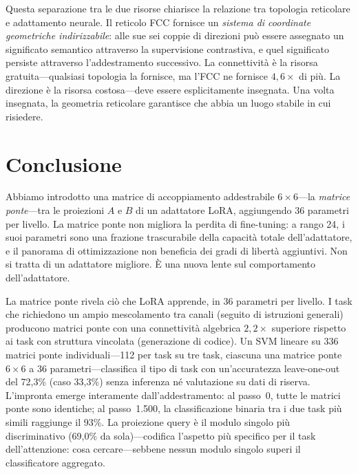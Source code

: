 \documentclass[11pt]{article}
\begin{document}
Questa separazione tra le due risorse chiarisce la relazione tra
topologia reticolare e adattamento neurale. Il reticolo FCC fornisce un
\emph{sistema di coordinate geometriche indirizzabile}: alle sue sei
coppie di direzioni pu\`o essere assegnato un significato semantico
attraverso la supervisione contrastiva, e quel significato persiste
attraverso l'addestramento successivo. La connettivit\`a \`e la risorsa
gratuita---qualsiasi topologia la fornisce, ma l'FCC ne fornisce
$4{,}6\times$ di pi\`u. La direzione \`e la risorsa costosa---deve
essere esplicitamente insegnata. Una volta insegnata, la geometria
reticolare garantisce che abbia un luogo stabile in cui risiedere.

\section{Conclusione}
\label{sec:conclusion}

Abbiamo introdotto una matrice di accoppiamento addestrabile
$6 \times 6$---la \emph{matrice ponte}---tra le proiezioni $A$ e $B$ di
un adattatore LoRA, aggiungendo 36 parametri per livello. La matrice
ponte non migliora la perdita di fine-tuning: a rango 24, i suoi
parametri sono una frazione trascurabile della capacit\`a totale
dell'adattatore, e il panorama di ottimizzazione non beneficia dei gradi
di libert\`a aggiuntivi. Non si tratta di un adattatore migliore. \`E
una nuova lente sul comportamento dell'adattatore.

La matrice ponte rivela ci\`o che LoRA apprende, in 36 parametri per
livello. I task che richiedono un ampio mescolamento tra canali (seguito
di istruzioni generali) producono matrici ponte con una connettivit\`a
algebrica $2{,}2\times$ superiore rispetto ai task con struttura
vincolata (generazione di codice). Un SVM lineare su 336 matrici
ponte individuali---112 per task su tre task, ciascuna una matrice
ponte $6 \times 6$ a 36 parametri---classifica il tipo di task con
un'accuratezza leave-one-out del 72,3\% (caso 33,3\%) senza
inferenza n\'e valutazione su dati di riserva. L'impronta emerge
interamente dall'addestramento: al passo~0, tutte le matrici ponte sono
identiche; al passo~1.500, la classificazione binaria tra i due task
pi\`u simili raggiunge il 93\%.
La proiezione query \`e il modulo singolo pi\`u discriminativo
(69,0\% da sola)---codifica l'aspetto pi\`u specifico per il task
dell'attenzione: cosa cercare---sebbene nessun modulo singolo superi
il classificatore aggregato.
\end{document}
